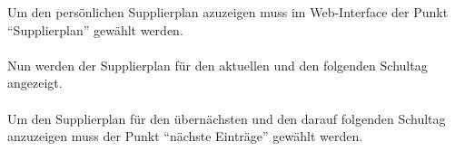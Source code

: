  Um den persönlichen Supplierplan azuzeigen muss im Web-Interface der Punkt \enquote{Supplierplan} gewählt werden.
 \\
 \\
 Nun werden der Supplierplan für den aktuellen und den folgenden Schultag angezeigt.
 \\
 \\
 Um den Supplierplan für den übernächsten und den darauf folgenden Schultag anzuzeigen muss der Punkt \enquote{nächste Einträge} gewählt werden.
